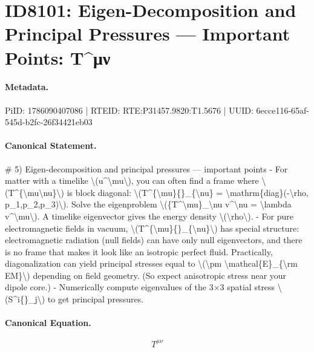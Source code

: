 \section*{ID8101: Eigen-Decomposition and Principal Pressures — Important Points: T\textasciicircum{}μν}
\paragraph{Metadata.}
PiID: 1786090407086 | RTEID: RTE:P31457.9820:T1.5676 | UUID: 6ecce116-65af-545d-b2fc-26f34421eb03

\paragraph{Canonical Statement.}
\# 5) Eigen-decomposition and principal pressures — important points - For matter with a timelike \textbackslash{}(u\textasciicircum{}\textbackslash{}mu\textbackslash{}), you can often find a frame where \textbackslash{}(T\textasciicircum{}\{\textbackslash{}mu\textbackslash{}nu\}\textbackslash{}) is block diagonal: \textbackslash{}(T\textasciicircum{}\{\textbackslash{}mu\}\{\}\_\{\textbackslash{}nu\} = \textbackslash{}mathrm\{diag\}(-\textbackslash{}rho, p\_1,p\_2,p\_3)\textbackslash{}). Solve the eigenproblem \textbackslash{}(\{T\textasciicircum{}\textbackslash{}mu\}\_\textbackslash{}nu v\textasciicircum{}\textbackslash{}nu = \textbackslash{}lambda v\textasciicircum{}\textbackslash{}mu\textbackslash{}). A timelike eigenvector gives the energy density \textbackslash{}(\textbackslash{}rho\textbackslash{}). - For pure electromagnetic fields in vacuum, \textbackslash{}(T\textasciicircum{}\{\textbackslash{}mu\}\{\}\_\{\textbackslash{}nu\}\textbackslash{}) has special structure: electromagnetic radiation (null fields) can have only null eigenvectors, and there is no frame that makes it look like an isotropic perfect fluid. Practically, diagonalization can yield principal stresses equal to \textbackslash{}(\textbackslash{}pm \textbackslash{}mathcal\{E\}\_\{\textbackslash{}rm EM\}\textbackslash{}) depending on field geometry. (So expect anisotropic stress near your dipole core.) - Numerically compute eigenvalues of the 3×3 spatial stress \textbackslash{}(S\textasciicircum{}i\{\}\_j\textbackslash{}) to get principal pressures.

\paragraph{Canonical Equation.}
\[
T^{\mu\nu}
\]

